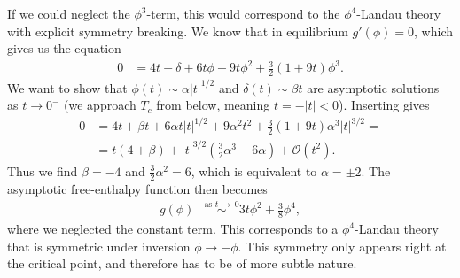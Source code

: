 \documentclass[english, parskip=full]{scrartcl}
\newcommand{\kla}{}
\newcommand{\tecxt}{}
\begin{document}
If we could neglect the $\phi^3$-term, this would correspond to the $\phi^4$-Landau theory with explicit symmetry breaking.
We know that in equilibrium $g'(\phi)=0$, which gives us the equation
\begin{align}
0 &= 4t+\delta + 6t\phi + 9t\phi^2 + \frac{3}{2}(1+9t)\phi^3.
\end{align}
We want to show that $\phi(t) \sim \alpha |t|^{1/2}$ and $\delta(t) \sim \beta t$ are asymptotic solutions as $t\rightarrow 0^-$ (we approach $T_c$ from below, meaning $t=-|t|<0$).
Inserting gives
\begin{align}
0 &= 4t + \beta t + 6\alpha t|t|^{1/2} + 9\alpha^2t^2+ \frac{3}{2}(1+9t) \alpha^3 |t|^{3/2} = \\
&= t\kla\left( 4+\beta \right)  + |t|^{3/2}\kla\left( \frac{3}{2}\alpha^3 - 6\alpha \right) + \mathcal{O}(t^2).
\end{align}
Thus we find $\beta = -4$ and $\frac{3}{2}\alpha^2 = 6$, which is equivalent to $\alpha = \pm 2$.
The asymptotic free-enthalpy function then becomes
\begin{align}
g(\phi) &\overset{\tecxt\text{as } t\,\rightarrow\, 0}{\sim} 3t\phi^2 + \frac{3}{8}\phi^4,
\end{align}
where we neglected the constant term.
This corresponds to a $\phi^4$-Landau theory that is symmetric under inversion $\phi \rightarrow -\phi$.
This symmetry only appears right at the critical point, and therefore has to be of more subtle nature.
\end{document}
